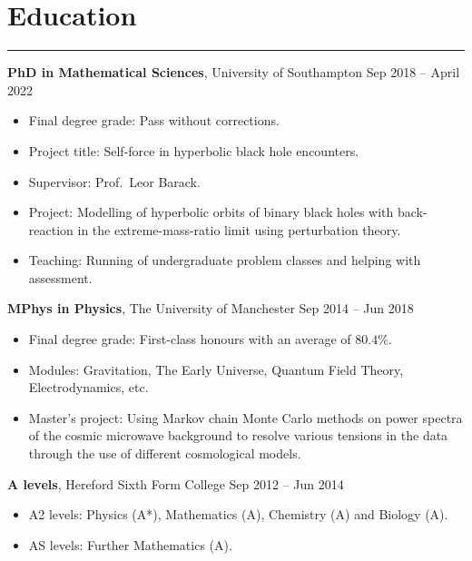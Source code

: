 \documentclass[10.5pt, oneside]{article}   	%
\begin{document}
{\color{Sectioncolour}
\section*{Education}
\vspace{-3mm}
\noindent\rule{\linewidth}{0.6pt}}

\textbf{PhD in Mathematical Sciences}, University of Southampton \hfill Sep 2018 -- April 2022 \\
\vspace{-5mm}
\begin{itemize}
\item Final degree grade: Pass without corrections.
\item Project title: Self-force in hyperbolic black hole encounters.
\item Supervisor: Prof.\ Leor Barack.
\item Project: Modelling of hyperbolic orbits of binary black holes with back-reaction in the extreme-mass-ratio limit using perturbation theory. 
\item Teaching: Running of undergraduate problem classes and helping with assessment.
\end{itemize}

\textbf{MPhys in Physics}, The University of Manchester \hfill Sep 2014 -- Jun 2018 \\
\vspace{-5mm}
\begin{itemize}
\item Final degree grade: First-class honours with an average of $80.4\%$.
\item Modules: Gravitation, The Early Universe, Quantum Field Theory,  Electrodynamics, etc.
\item Master's project: Using Markov chain Monte Carlo methods on power spectra of the cosmic microwave background to resolve various tensions in the data through the use of different cosmological models.
\end{itemize} 

\textbf{A levels}, Hereford Sixth Form College \hfill Sep 2012 -- Jun 2014 \\
\vspace{-5mm}
\begin{itemize}
\item A2 levels: Physics (A*), Mathematics (A), Chemistry (A) and Biology (A).
\item AS levels: Further Mathematics (A).
\end{itemize} 
\end{document}
